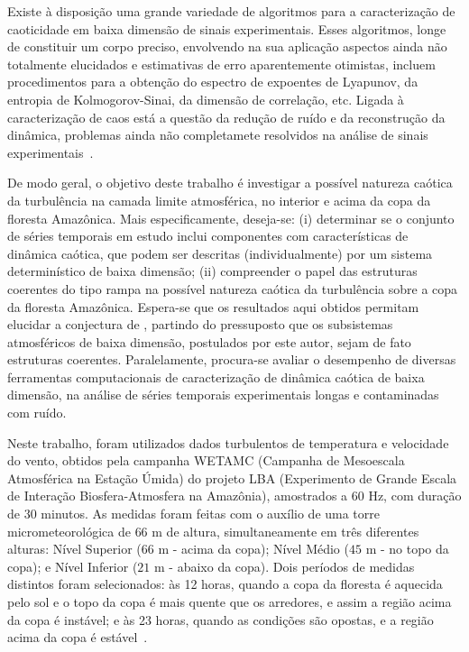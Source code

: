 Existe à disposição uma grande variedade de algoritmos para a caracterização de caoticidade em baixa dimensão de sinais experimentais. Esses algoritmos, longe de constituir um corpo preciso, envolvendo na sua aplicação aspectos ainda não totalmente elucidados e estimativas de erro aparentemente otimistas, incluem procedimentos para a obtenção do espectro de expoentes de Lyapunov, da entropia de Kolmogorov-Sinai, da dimensão de correlação, etc. Ligada à caracterização de caos está a questão da redução de ruído e da reconstrução da dinâmica, problemas ainda não completamete resolvidos na análise de sinais experimentais~\cite{aguirre/00}. 

De modo geral, o objetivo deste trabalho é investigar a possível natureza caótica da turbulência na camada limite atmosférica, no interior e acima da copa da floresta Amazônica. Mais especificamente, deseja-se: (i) determinar se o conjunto de séries temporais em estudo inclui componentes com características de dinâmica caótica, que podem ser descritas (individualmente) por um sistema determinístico de baixa dimensão; (ii) compreender o papel das estruturas coerentes do tipo rampa na possível natureza caótica da turbulência sobre a copa da floresta Amazônica. Espera-se que os resultados aqui obtidos permitam elucidar a conjectura de , partindo do pressuposto que os subsistemas atmosféricos de baixa dimensão, postulados por este autor, sejam de fato estruturas coerentes. Paralelamente, procura-se avaliar o desempenho de diversas ferramentas computacionais de caracterização de dinâmica caótica de baixa dimensão, na análise de séries temporais experimentais longas e contaminadas com ruído.

Neste trabalho, foram utilizados dados turbulentos de temperatura e velocidade do vento, obtidos pela campanha WETAMC (Campanha de Mesoescala Atmosférica na Estação Úmida) do projeto LBA (Experimento de Grande Escala de Interação Biosfera-Atmosfera na Amazônia), amostrados a $60$ Hz, com duração de $30$ minutos. As medidas foram feitas com o auxílio de uma torre micrometeorológica de $66$ m de altura, simultaneamente em três diferentes alturas: Nível Superior ($66$ m - acima da copa); Nível Médio ($45$ m -  no topo da copa); e Nível Inferior ($21$ m - abaixo da copa). Dois períodos de medidas distintos foram selecionados: às 12 horas, quando a copa da floresta é aquecida pelo sol e o topo da copa é mais quente que os arredores, e assim a região acima da copa é instável; e às 23 horas, quando as condições são opostas, e a região acima da copa é estável~\cite{Ramos/04}.

